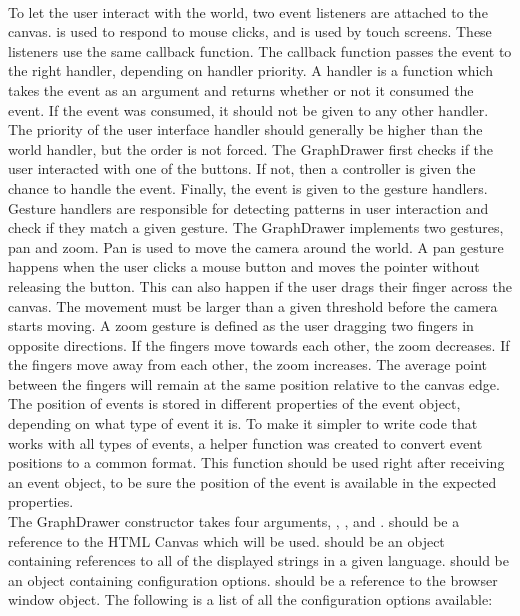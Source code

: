 \\[11pt]
To let the user interact with the world, two event listeners are attached to the canvas.  is used to respond to mouse clicks, and  is used by touch screens. These listeners use the same callback function. The callback function passes the event to the right handler, depending on handler priority. A handler is a function which takes the event as an argument and returns whether or not it consumed the event. If the event was consumed, it should not be given to any other handler. The priority of the user interface handler should generally be higher than the world handler, but the order is not forced. The GraphDrawer first checks if the user interacted with one of the buttons. If not, then a controller is given the chance to handle the event. Finally, the event is given to the gesture handlers. Gesture handlers are responsible for detecting patterns in user interaction and check if they match a given gesture. The GraphDrawer implements two gestures, pan and zoom. Pan is used to move the camera around the world. A pan gesture happens when the user clicks a mouse button and moves the pointer without releasing the button. This can also happen if the user drags their finger across the canvas. The movement must be larger than a given threshold before the camera starts moving. A zoom gesture is defined as the user dragging two fingers in opposite directions. If the fingers move towards each other, the zoom decreases. If the fingers move away from each other, the zoom increases. The average point between the fingers will remain at the same position relative to the canvas edge. The position of events is stored in different properties of the event object, depending on what type of event it is. To make it simpler to write code that works with all types of events, a helper function  was created to convert event positions to a common format. This function should be used right after receiving an event object, to be sure the position of the event is available in the expected properties.
\\[11pt]
The GraphDrawer constructor takes four arguments, , ,  and .  should be a reference to the HTML Canvas which will be used.  should be an object containing references to all of the displayed strings in a given language.  should be an object containing configuration options.  should be a reference to the browser window object. The following is a list of all the configuration options available:
